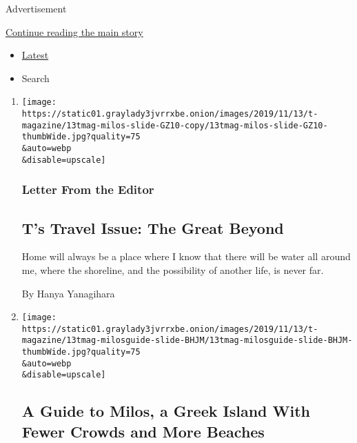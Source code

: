 Advertisement

\protect\hyperlink{after-mid1}{Continue reading the main story}

\begin{itemize}
\tightlist
\item
  \protect\hyperlink{stream-panel}{Latest}
\item
  Search
\end{itemize}

\begin{enumerate}
\def\labelenumi{\arabic{enumi}.}
\item
  \href{/2019/11/15/t-magazine/ts-travel-issue-the-great-beyond.html}{}

  \texttt{[image: https://static01.graylady3jvrrxbe.onion/images/2019/11/13/t-magazine/13tmag-milos-slide-GZ10-copy/13tmag-milos-slide-GZ10-thumbWide.jpg?quality=75\\\&auto=webp\\\&disable=upscale]}

  \hypertarget{letter-from-the-editor}{%
  \subsubsection{Letter From the Editor}\label{letter-from-the-editor}}

  \hypertarget{ts-travel-issue-the-great-beyond}{%
  \subsection{T's Travel Issue: The Great
  Beyond}\label{ts-travel-issue-the-great-beyond}}

  Home will always be a place where I know that there will be water all
  around me, where the shoreline, and the possibility of another life,
  is never far.

  By Hanya Yanagihara
\item
  \href{/2019/11/14/t-magazine/milos-greece-travel-guide.html}{}

  \texttt{[image: https://static01.graylady3jvrrxbe.onion/images/2019/11/13/t-magazine/13tmag-milosguide-slide-BHJM/13tmag-milosguide-slide-BHJM-thumbWide.jpg?quality=75\\\&auto=webp\\\&disable=upscale]}

  \hypertarget{a-guide-to-milos-a-greek-island-with-fewer-crowds-and-more-beaches}{%
  \subsection{A Guide to Milos, a Greek Island With Fewer Crowds and
  More
  Beaches}\label{a-guide-to-milos-a-greek-island-with-fewer-crowds-and-more-beaches}}


\end{enumerate}
